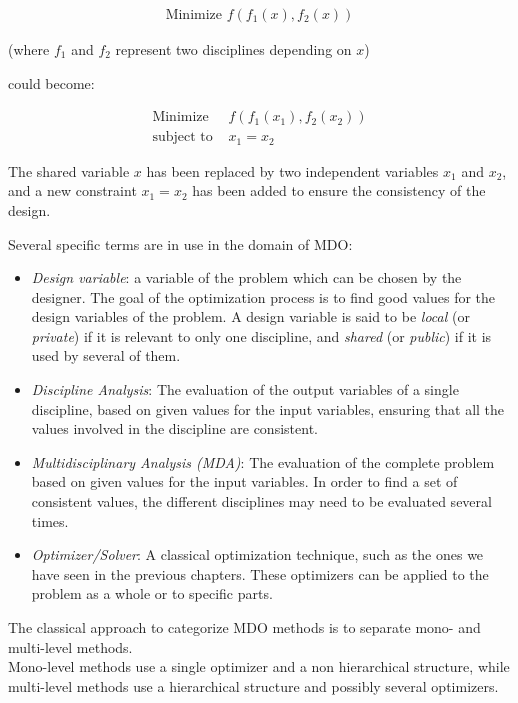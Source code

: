 \begin{align*}
\text{Minimize } f(f_1(x), f_2(x))
\end{align*}

(where $f_1$ and $f_2$ represent two disciplines depending on $x$)

could become:

\begin{align*}
\text{Minimize } &f(f_1(x_1), f_2(x_2))\\
\text{subject to } &x_1=x_2
\end{align*}

The shared variable $x$ has been replaced by two independent variables $x_1$ and $x_2$, and a new constraint $x_1=x_2$ has been added to ensure the consistency of the design.

Several specific terms are in use in the domain of MDO:

\begin{itemize}

\item \emph{Design variable}: a variable of the problem which can be chosen by the designer. The goal of the optimization process is to find good values for the design variables of the problem. A design variable is said to be \emph{local} (or \emph{private}) if it is relevant to only one discipline, and \emph{shared} (or \emph{public}) if it is used by several of them.

\item \emph{Discipline Analysis}: The evaluation of the output variables of a single discipline, based on given values for the input variables, ensuring that all the values involved in the discipline are consistent.

\item \emph{Multidisciplinary Analysis (MDA)}: The evaluation of the complete problem based on given values for the input variables. In order to find a set of consistent values, the different disciplines may need to be evaluated several times.

\item \emph{Optimizer/Solver}: A classical optimization technique, such as the ones we have seen in the previous chapters. These optimizers can be applied to the problem as a whole or to specific parts.

\end{itemize}

The classical approach to categorize MDO methods is to separate mono- and multi-level methods.\\
Mono-level methods use a single optimizer and a non hierarchical structure, while multi-level methods use a hierarchical structure and possibly several optimizers.

